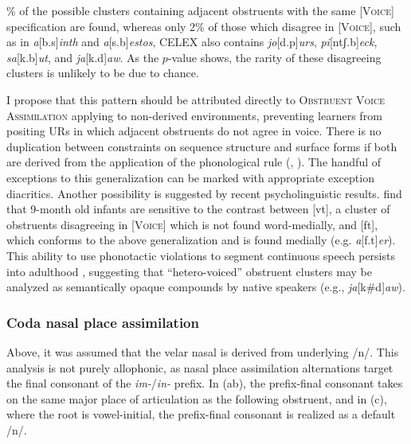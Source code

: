 \% of the possible clusters containing adjacent obstruents with the same [\textsc{Voice}] specification are found, 
whereas only 2\%  of those which disagree in [\textsc{Voice}], 
such as in \emph{a}[b.s]\emph{inth} and \emph{a}[s.b]\emph{estos}, 
CELEX also contains \emph{jo}[d.p]\emph{urs}, \emph{pi}[ntʃ.b]\emph{eck}, \emph{sa}[k.b]\emph{ut}, and \emph{ja}[k.d]\emph{aw}. 
As the $p$-value shows, 
the rarity of these disagreeing clusters is unlikely to be due to chance. 

I propose that this pattern should be attributed directly to \textsc{Obstruent Voice Assimilation} applying to non-derived environments, preventing learners from positing URs in which adjacent obstruents do not agree in voice. There is no duplication between constraints on sequence structure and surface forms if both are derived from the application of the phonological rule (\citealt[][401f.]{Stanley1967}, \citealt[][382]{SPE}). The handful of exceptions to this generalization can be marked with appropriate exception diacritics. Another possibility is suggested by recent psycholinguistic results. \citet{Mattys2001b} find that 9-month old infants are sensitive to the contrast between [vt], a cluster of obstruents disagreeing in [\textsc{Voice}] which is not found word-medially, and [ft], which conforms to the above generalization and is found medially (e.g. \emph{a}[f.t]\emph{er}). This ability to use phonotactic violations to segment continuous speech persists into adulthood \citep{McQueen1998}, suggesting that ``hetero-voiced'' obstruent clusters may be analyzed as semantically opaque compounds by native speakers (e.g., \emph{ja}[k\#d]\emph{aw}). 

\subsubsection{Coda nasal place assimilation}
\label{cnpasection}

Above, it was assumed that the velar nasal is derived from underlying /n/. 
This analysis is not purely allophonic, as nasal place assimilation alternations target the final consonant of the \emph{im-}/\emph{in-} prefix. In (\lastx ab), the prefix-final consonant takes on the same major place of articulation as the following obstruent, and in (\lastx c), where the root is vowel-initial, the prefix-final consonant is realized as a default /n/.

